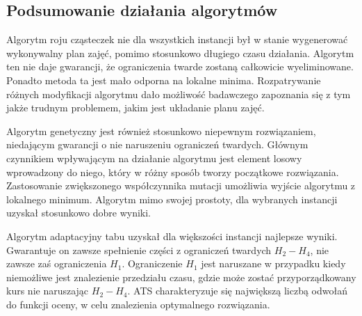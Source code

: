 \subsection{Podsumowanie działania algorytmów}
\par Algorytm roju cząsteczek nie dla wszystkich instancji był w stanie wygenerować wykonywalny plan zajęć, pomimo stosunkowo długiego czasu działania. Algorytm ten nie daje gwarancji, że ograniczenia twarde zostaną całkowicie wyeliminowane. Ponadto metoda ta jest mało odporna na lokalne minima. Rozpatrywanie różnych modyfikacji algorytmu dało możliwość badawczego zapoznania się z tym jakże trudnym problemem, jakim jest układanie planu zajęć.
\par Algorytm genetyczny jest również stosunkowo niepewnym rozwiązaniem, niedającym gwarancji o nie naruszeniu ograniczeń twardych. Głównym czynnikiem wpływającym na działanie algorytmu jest element losowy wprowadzony do niego, który w różny sposób tworzy początkowe rozwiązania. Zastosowanie zwiększonego współczynnika mutacji umożliwia wyjście algorytmu z lokalnego minimum. Algorytm mimo swojej prostoty, dla wybranych instancji uzyskał stosunkowo dobre wyniki.
\par Algorytm adaptacyjny tabu uzyskał dla większości instancji najlepsze wyniki. Gwarantuje on zawsze spełnienie części z ograniczeń twardych $H_{2}-H_{4}$, nie zawsze zaś ograniczenia $H_{1}$. Ograniczenie ${H_{1}}$ jest naruszane w przypadku kiedy niemożliwe jest znalezienie przedziału czasu, gdzie może zostać przyporządkowany kurs nie naruszając $H_{2}-H_{4}$. ATS charakteryzuje się największą liczbą odwołań do funkcji oceny, w celu znalezienia optymalnego rozwiązania.







